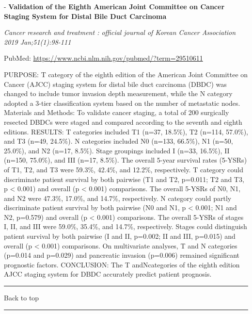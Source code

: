 \documentclass[]{article}
\begin{document}
 - \textbf{Validation of the Eighth American Joint Committee on Cancer
Staging System for Distal Bile Duct Carcinoma}

\emph{Cancer research and treatment : official journal of Korean Cancer
Association 2019 Jan;51(1):98-111}

PubMed: \url{https://www.ncbi.nlm.nih.gov/pubmed/?term=29510611}

PURPOSE: T category of the eighth edition of the American Joint
Committee on Cancer (AJCC) staging system for distal bile duct carcinoma
(DBDC) was changed to include tumor invasion depth measurement, while
the N category adopted a 3-tier classification system based on the
number of metastatic nodes. Materials and Methods: To validate cancer
staging, a total of 200 surgically resected DBDCs were staged and
compared according to the seventh and eighth editions. RESULTS: T
categories included T1 (n=37, 18.5\%), T2 (n=114, 57.0\%), and T3 (n=49,
24.5\%). N categories included N0 (n=133, 66.5\%), N1 (n=50, 25.0\%),
and N2 (n=17, 8.5\%). Stage groupings included I (n=33, 16.5\%), II
(n=150, 75.0\%), and III (n=17, 8.5\%). The overall 5-year survival
rates (5-YSRs) of T1, T2, and T3 were 59.3\%, 42.4\%, and 12.2\%,
respectively. T category could discriminate patient survival by both
pairwise (T1 and T2, p=0.011; T2 and T3, p \textless{} 0.001) and
overall (p \textless{} 0.001) comparisons. The overall 5-YSRs of N0, N1,
and N2 were 47.3\%, 17.0\%, and 14.7\%, respectively. N category could
partly discriminate patient survival by both pairwise (N0 and N1, p
\textless{} 0.001; N1 and N2, p=0.579) and overall (p \textless{} 0.001)
comparisons. The overall 5-YSRs of stages I, II, and III were 59.0\%,
35.4\%, and 14.7\%, respectively. Stages could distinguish patient
survival by both pairwise (I and II, p=0.002; II and III, p=0.015) and
overall (p \textless{} 0.001) comparisons. On multivariate analyses, T
and N categories (p=0.014 and p=0.029) and pancreatic invasion (p=0.006)
remained significant prognostic factors. CONCLUSION: The T
andNcategories of the eighth edition AJCC staging system for DBDC
accurately predict patient prognosis.

{}

{}

\begin{center}\rule{0.5\linewidth}{\linethickness}\end{center}

Back to top

\begin{center}\rule{0.5\linewidth}{\linethickness}\end{center}
\end{document}
